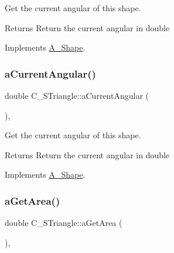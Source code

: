 Get the current angular of this shape. 

\begin{DoxyReturn}{Returns}
Return the current angular in double 
\end{DoxyReturn}


Implements \hyperlink{classA__Shape_a80fa4e009c875dd0ba7fc5bfeeb43f98}{A\+\_\+\+Shape}.

\mbox{\label{classC__STriangle_a38304830925938339c4a4a0ad812e151}} 
\subsubsection{\texorpdfstring{a\+Current\+Angular()}{aCurrentAngular()}\hspace{0.1cm}{\footnotesize\ttfamily [2/2]}}
{\footnotesize\ttfamily double C\+\_\+\+S\+Triangle\+::a\+Current\+Angular (\begin{DoxyParamCaption}{ }\end{DoxyParamCaption})\hspace{0.3cm}{\ttfamily [override]}, {\ttfamily [virtual]}}



Get the current angular of this shape. 

\begin{DoxyReturn}{Returns}
Return the current angular in double 
\end{DoxyReturn}


Implements \hyperlink{classA__Shape_a80fa4e009c875dd0ba7fc5bfeeb43f98}{A\+\_\+\+Shape}.

\mbox{\label{classC__STriangle_aaff25f3c7f7640c3e7c735a77800e96e}} 
\subsubsection{\texorpdfstring{a\+Get\+Area()}{aGetArea()}\hspace{0.1cm}{\footnotesize\ttfamily [1/2]}}
{\footnotesize\ttfamily double C\+\_\+\+S\+Triangle\+::a\+Get\+Area (\begin{DoxyParamCaption}{ }\end{DoxyParamCaption})\hspace{0.3cm}{\ttfamily [override]}, {\ttfamily [virtual]}}



